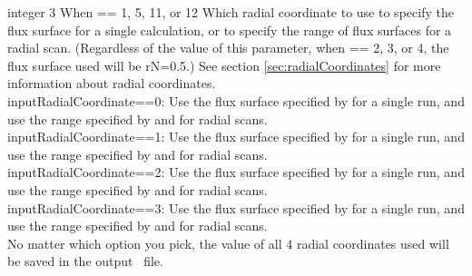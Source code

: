 \myhrule

{integer}
{3}
{When  == 1, 5, 11, or 12}
{Which radial coordinate to use to specify the flux surface for a single calculation,
or to specify the range of flux surfaces for a radial scan. 
(Regardless of the value of this parameter, when  == 2, 3, or 4, the flux surface used will be {\ttfamily rN}=0.5.)
See section \ref{sec:radialCoordinates}
for more information about radial coordinates.\\

{\ttfamily inputRadialCoordinate}==0: Use the flux surface specified by 
for a single run, and use the range specified by  and  for radial scans.\\

{\ttfamily inputRadialCoordinate}==1: Use the flux surface specified by 
for a single run, and use the range specified by  and  for radial scans.\\

{\ttfamily inputRadialCoordinate}==2: Use the flux surface specified by 
for a single run, and use the range specified by  and  for radial scans.\\

{\ttfamily inputRadialCoordinate}==3: Use the flux surface specified by 
for a single run, and use the range specified by  and  for radial scans. \\

No matter which option you pick, the value of all 4 radial coordinates used will be saved in the output \HDF~file.
}

\myhrule


